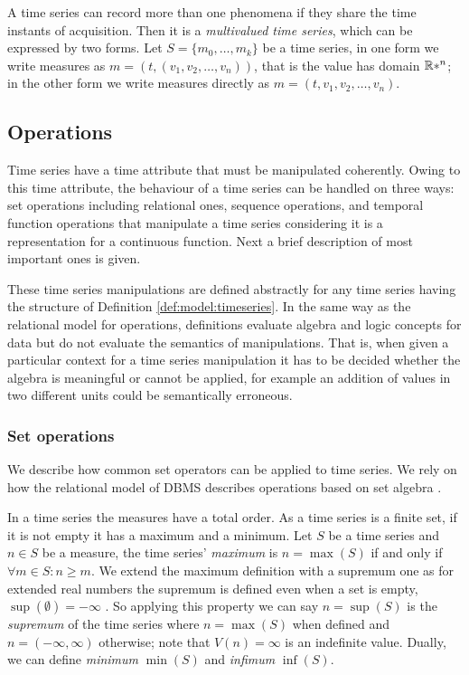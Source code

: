 A time series can record more than one phenomena if they share the
time instants of acquisition. Then it is a \emph{multivalued time
series}, which can be expressed by two forms. Let $S = \{m_0, \ldots,
m_k\}$ be a time series, in one form we write measures as
$m=(t,(v_1,v_2,\ldots,v_n))$, that is the value has domain $\mathbb{R}*^n$; in
the other form we write measures directly as
$m=(t,v_1,v_2,\ldots,v_n)$.




\subsection{Operations}
\label{sec:model:operations}

Time series have a time attribute that must be manipulated
coherently. Owing to this time attribute, the behaviour of a time
series can be handled on three ways:  set operations including
relational ones,  sequence operations, and  temporal function
operations that manipulate a time series considering it is a
representation for a continuous function. Next a brief description of
most important ones is given.


These time series manipulations are defined abstractly for any time
series having the structure of Definition \ref{def:model:timeseries}.
In the same way as the relational model for operations, definitions
evaluate algebra and logic concepts for data but do not evaluate the
semantics of manipulations. That is, when given a particular context
for a time series manipulation it has to be decided whether the
algebra is meaningful or cannot be applied, for example an addition of
values in two different units could be semantically erroneous.


\subsubsection{Set operations}

We describe how common set operators can be applied to time series. We
rely on how the relational model of DBMS describes operations based on
set algebra \cite{date:introduction}.


In a time series the measures have a total order.  As a time series is
a finite set, if it is not empty it has a maximum and a minimum.  Let
$S$ be a time series and $n\in S$ be a measure, the time series'
\emph{maximum} is $n=\max(S)$ if and only if $\forall m \in S: n \geq
m $.  We extend the maximum definition with a supremum one as for
extended real numbers the supremum is defined even when a set is
empty, $\sup(\emptyset)=-\infty$ \cite{cantrell:extendedreal}. So
applying this property we can say $n=\sup(S)$ is the \emph{supremum}
of the time series where $n=\max(S)$ when defined and
$n=(-\infty,\infty)$ otherwise; note that $V(n)=\infty$ is an
indefinite value.  Dually, we can define \emph{minimum} $\min(S)$ and
\emph{infimum} $\inf(S)$.


